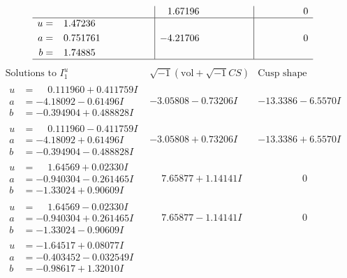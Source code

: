 \documentclass[1p]{elsarticle_modified}
\theoremstyle{definition}
\newcommand{\I}{\sqrt{-1}}
\begin{document}
$$\begin{array}{c|c|c}
 & \phantom{-}1.67196\phantom{ +0.000000I} & \phantom{-0.000000 } 0 \\ \hline\begin{aligned}
u &= \phantom{-}1.47236\phantom{ +0.000000I} \\
a &= \phantom{-}0.751761\phantom{ +0.000000I} \\
b &= \phantom{-}1.74885\phantom{ +0.000000I}\end{aligned}
 & -4.21706\phantom{ +0.000000I} & \phantom{-0.000000 } 0\\
 \hline 
 \end{array}$$\newpage$$\begin{array}{c|c|c}  
\text{Solutions to }I^u_{1}& \I (\text{vol} + \sqrt{-1}CS) & \text{Cusp shape}\\
 \hline 
\begin{aligned}
u &= \phantom{-}0.111960 + 0.411759 I \\
a &= -4.18092 - 0.61496 I \\
b &= -0.394904 + 0.488828 I\end{aligned}
 & -3.05808 - 0.73206 I & -13.3386 - 6.5570 I \\ \hline\begin{aligned}
u &= \phantom{-}0.111960 - 0.411759 I \\
a &= -4.18092 + 0.61496 I \\
b &= -0.394904 - 0.488828 I\end{aligned}
 & -3.05808 + 0.73206 I & -13.3386 + 6.5570 I \\ \hline\begin{aligned}
u &= \phantom{-}1.64569 + 0.02330 I \\
a &= -0.940304 - 0.261465 I \\
b &= -1.33024 + 0.90609 I\end{aligned}
 & \phantom{-}7.65877 + 1.14141 I & \phantom{-0.000000 } 0 \\ \hline\begin{aligned}
u &= \phantom{-}1.64569 - 0.02330 I \\
a &= -0.940304 + 0.261465 I \\
b &= -1.33024 - 0.90609 I\end{aligned}
 & \phantom{-}7.65877 - 1.14141 I & \phantom{-0.000000 } 0 \\ \hline\begin{aligned}
u &= -1.64517 + 0.08077 I \\
a &= -0.403452 - 0.032549 I \\
b &= -0.98617 + 1.32010 I\end{aligned}

\end{array}$$
\end{document}
